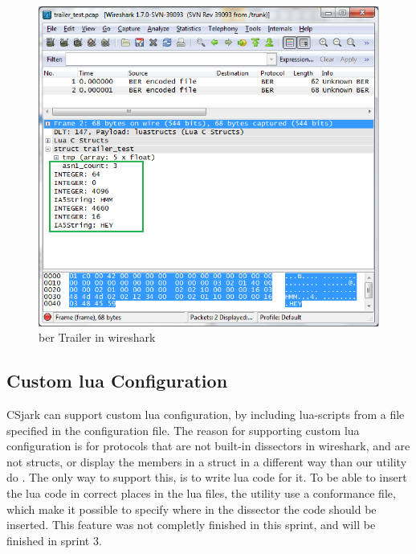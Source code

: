 \begin{figure}[ht]
	\center
	\includegraphics[width=\textwidth]{./sprints/img/wireshark_trailer}
	\caption{\gls{ber} Trailer in \Gls{wireshark}\label{fig:wstrailer}}
\end{figure}





\subsection{Custom \Gls{lua} Configuration}
CSjark can support custom \Gls{lua} configuration, by including \Gls{lua}-\glspl{script} from a 
file specified in the configuration file. The reason for supporting custom \Gls{lua} 
configuration is for protocols that are not built-in \glspl{dissector} in \Gls{wireshark}, 
and are not \glspl{struct}, or display the members in a struct in a different way 
than our utility do . The only way to support this, is to write \Gls{lua} code for 
it. To be able to insert the \Gls{lua} code in correct places in the lua files, the 
utility use a conformance file, which make it possible to specify where in the 
dissector the code should be inserted. This feature was not completly finished 
in this sprint, and will be finished in sprint 3.

